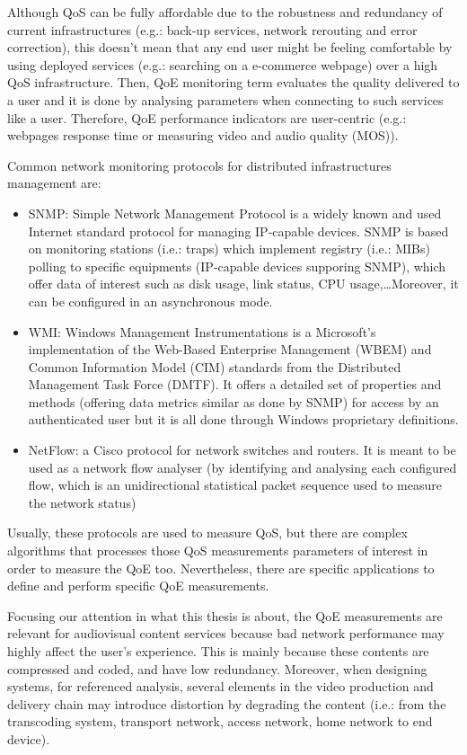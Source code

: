 Although QoS can be fully affordable due to the robustness and redundancy of current infrastructures (e.g.: back-up services, network rerouting and error correction), this doesn't mean that any end user might be feeling comfortable by using deployed services (e.g.: searching on a e-commerce webpage) over a high QoS infrastructure. Then, QoE monitoring term evaluates the quality delivered to a user and it is done by analysing parameters when connecting to such services like a user. Therefore, QoE performance indicators are user-centric (e.g.: webpages response time or measuring video and audio quality (MOS)).

Common network monitoring protocols for distributed infrastructures management are:

\begin{itemize}
\item SNMP: Simple Network Management Protocol is a widely known and used Internet standard protocol for managing IP-capable devices. SNMP is based on monitoring stations (i.e.: traps) which implement registry (i.e.: MIBs) polling to specific equipments (IP-capable devices supporing SNMP), which offer data of interest such as disk usage, link status, CPU usage,\ldots Moreover, it can be configured in an asynchronous mode.
\item WMI: Windows Management Instrumentations is a Microsoft's implementation of the Web-Based Enterprise Management (WBEM) and Common Information Model (CIM) standards from the Distributed Management Task Force (DMTF). It offers a detailed set of properties and methods (offering data metrics similar as done by SNMP) for access by an authenticated user but it is all done through Windows proprietary definitions.
\item NetFlow: a Cisco protocol for network switches and routers. It is meant to be used as a network flow analyser (by identifying and analysing each configured flow, which is an unidirectional statistical packet sequence used to measure the network status) 
\end{itemize}  

Usually, these protocols are used to measure QoS, but there are complex algorithms that processes those QoS measurements parameters of interest in order to measure the QoE too. Nevertheless, there are specific applications to define and perform specific QoE measurements. 

Focusing our attention in what this thesis is about, the QoE measurements are relevant for audiovisual content services because bad network performance may highly affect the user's experience. This is mainly because these contents are compressed and coded, and have low redundancy. Moreover, when designing systems, for referenced analysis, several elements in the video production and delivery chain may introduce distortion by degrading the content (i.e.: from the transcoding system, transport network, access network, home network to end device).

